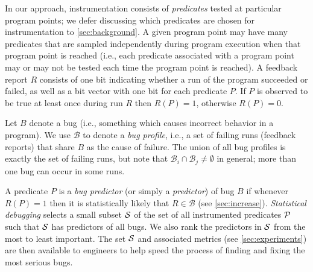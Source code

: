 \documentclass[final]{sigplanconf}
\newcommand{\bug}{\ensuremath{B}}
\newcommand{\bugprofile}{\ensuremath{\mathcal{B}}}
\newcommand{\termdef}[1]{\emph{#1}}
\newcommand{\report}[1]{\ensuremath{R(#1)}}
\begin{document}
In our approach, instrumentation consists of \termdef{predicates} tested
at particular program points; we defer discussing which predicates are
chosen for instrumentation to \autoref{sec:background}.  A given
program point may have many predicates that are sampled independently
during program execution when that program point is reached (i.e.,
each predicate associated with a program point may or may not be
tested each time the program point is reached).  A feedback report $R$
consists of one bit indicating whether a run of the program
succeeded or failed, as well as a bit vector with one bit for each
predicate $P$.  If $P$ is observed to be true at least once during run
$R$ then $\report{P} = 1$, otherwise $\report{P} = 0$.

Let $\bug$ denote a bug (i.e., something which causes incorrect
behavior in a program).  We use $\bugprofile$ to denote a \termdef{bug
profile}, i.e., a set of failing runs (feedback reports) that share
$\bug$ as the cause of failure.  The union of all bug profiles is
exactly the set of failing runs, but note that $\bugprofile_i \cap
\bugprofile_j \neq
\emptyset$ in general; more than one bug can occur in some runs.

A predicate $P$ is a \termdef{bug predictor} (or simply a
\termdef{predictor}) of bug $\bug$ if whenever $\report{P} = 1$
then it is statistically likely that $R \in \bugprofile$ (see
\autoref{sec:increase}).  \termdef{Statistical debugging} selects a
small subset ${\cal S}$ of the set of all instrumented predicates ${\cal P}$ such
that ${\cal S}$ has predictors of all bugs.  We also rank the
predictors in ${\cal S}$ from the most to least important.  The set
${\cal S}$ and associated metrics (see
\autoref{sec:experiments}) are then available to engineers to help
speed the process of finding and fixing the most serious bugs.
\end{document}
